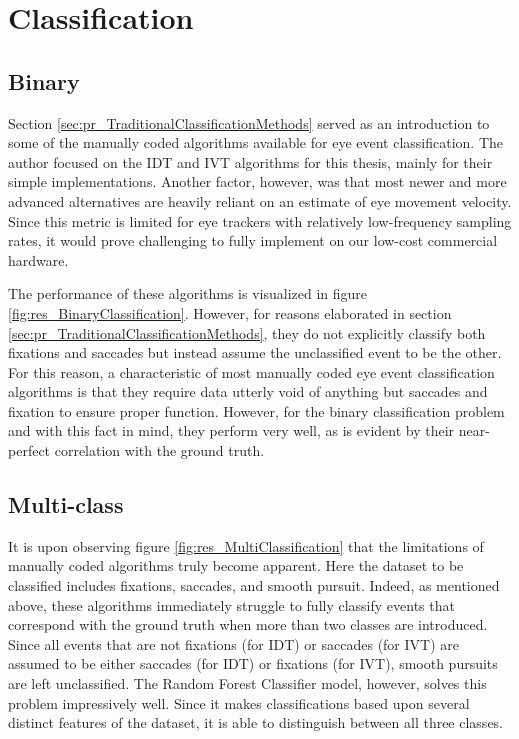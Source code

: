 \section{Classification} \label{sec:disc_Classification}


\subsection{Binary}
Section \ref{sec:pr_TraditionalClassificationMethods} served as an introduction to some of the manually coded algorithms available for eye event classification. The author focused on the IDT and IVT algorithms for this thesis, mainly for their simple implementations. Another factor, however, was that most newer and more advanced alternatives are heavily reliant on an estimate of eye movement velocity. Since this metric is limited for eye trackers with relatively low-frequency sampling rates, it would prove challenging to fully implement on our low-cost commercial hardware. 

The performance of these algorithms is visualized in figure \ref{fig:res_BinaryClassification}. However, for reasons elaborated in section \ref{sec:pr_TraditionalClassificationMethods}, they do not explicitly classify both fixations and saccades but instead assume the unclassified event to be the other. For this reason, a characteristic of most manually coded eye event classification algorithms is that they require data utterly void of anything but saccades and fixation to ensure proper function. However, for the binary classification problem and with this fact in mind, they perform very well, as is evident by their near-perfect correlation with the ground truth.

\subsection{Multi-class}

It is upon observing figure \ref{fig:res_MultiClassification} that the limitations of manually coded algorithms truly become apparent. Here the dataset to be classified includes fixations, saccades, and smooth pursuit. Indeed, as mentioned above, these algorithms immediately struggle to fully classify events that correspond with the ground truth when more than two classes are introduced. Since all events that are not fixations (for IDT) or saccades (for IVT) are assumed to be either saccades (for IDT) or fixations (for IVT), smooth pursuits are left unclassified. The Random Forest Classifier model, however, solves this problem impressively well. Since it makes classifications based upon several distinct features of the dataset, it is able to distinguish between all three classes.

